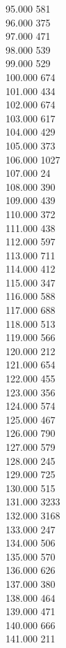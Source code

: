 { 95.000	581 \\
 96.000	375 \\
 97.000	471 \\
 98.000	539 \\
 99.000	529 \\
 100.000	674 \\
 101.000	434 \\
 102.000	674 \\
 103.000	617 \\
 104.000	429 \\
 105.000	373 \\
 106.000	1027 \\
 107.000	24 \\
 108.000	390 \\
 109.000	439 \\
 110.000	372 \\
 111.000	438 \\
 112.000	597 \\
 113.000	711 \\
 114.000	412 \\
 115.000	347 \\
 116.000	588 \\
 117.000	688 \\
 118.000	513 \\
 119.000	566 \\
 120.000	212 \\
 121.000	654 \\
 122.000	455 \\
 123.000	356 \\
 124.000	574 \\
 125.000	467 \\
 126.000	790 \\
 127.000	579 \\
 128.000	245 \\
 129.000	725 \\
 130.000	515 \\
 131.000	3233 \\
 132.000	3168 \\
 133.000	247 \\
 134.000	506 \\
 135.000	570 \\
 136.000	626 \\
 137.000	380 \\
 138.000	464 \\
 139.000	471 \\
 140.000	666 \\
 141.000	211 \\
}
